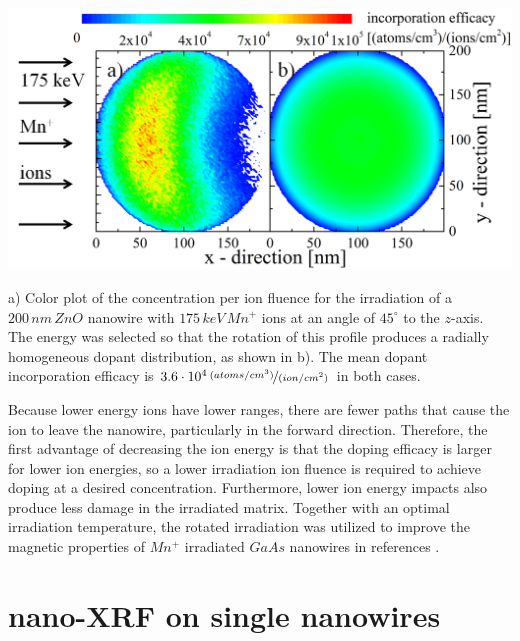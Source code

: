 \begin{Figure}
	\centering
		\includegraphics[width=.8\textwidth]{images/iradinacrosssection.png}
	\caption{a) Color plot of the concentration per ion fluence for the irradiation of a $200\,nm\,ZnO$ nanowire with $175\,keV\,Mn^+$ ions at an angle of $45^\circ$ to the $z$-axis. The energy was selected so that the rotation of this profile produces a radially homogeneous dopant distribution, as shown in b). The mean dopant incorporation efficacy is $3.6\cdot10^4\,\nicefrac{(atoms/cm^3)}{(ion/cm^2)}$ in both cases.}
	\label{iradinacrossection}
\end{Figure} 

Because lower energy ions have lower ranges, there are fewer paths that cause the ion to leave the nanowire, particularly in the forward direction. Therefore, the first advantage of decreasing the ion energy is that the doping efficacy is larger for lower ion energies, so a lower irradiation ion fluence is required to achieve doping at a desired concentration. Furthermore, lower ion energy impacts also produce less damage in the irradiated matrix. Together with an optimal irradiation temperature, the rotated irradiation was utilized to improve the magnetic properties of $Mn^+$ irradiated $GaAs$ nanowires in references \cite{borschel_new_2011,paschoal_hopping_2012,borschel_ion-solid_2012,kumar_magnetic_2013,paschoal_magnetoresistance_2014}. 




\section{nano-XRF on single nanowires}

